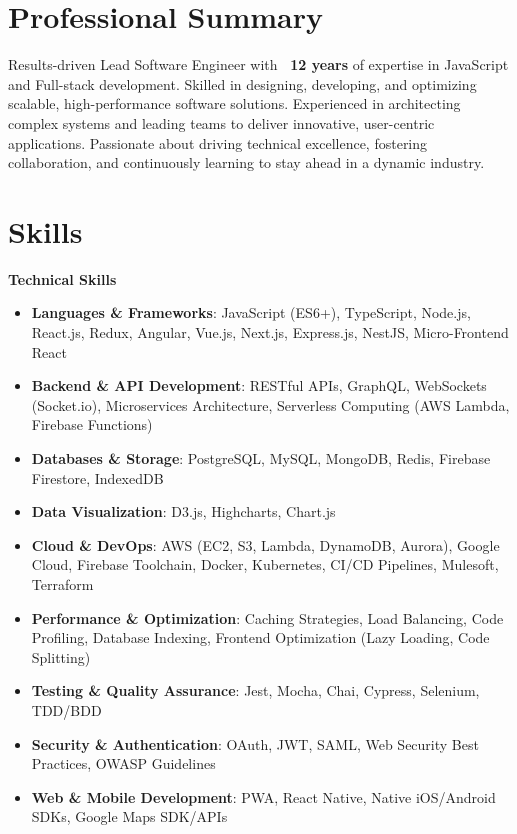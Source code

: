 \documentclass[10pt,a4paper]{article}
\begin{document}
\thispagestyle{fancy}

\section*{Professional Summary}
Results-driven Lead Software Engineer with \textbf{~12 years} of expertise in JavaScript and Full-stack development. Skilled in designing, developing, and optimizing scalable, high-performance software solutions. Experienced in architecting complex systems and leading teams to deliver innovative, user-centric applications. Passionate about driving technical excellence, fostering collaboration, and continuously learning to stay ahead in a dynamic industry.

\section*{Skills}

\textbf{Technical Skills}
\begin{itemize}[leftmargin=*]
  \item \textbf{Languages \& Frameworks}: JavaScript (ES6+), TypeScript, Node.js, React.js, Redux, Angular, Vue.js, Next.js, Express.js, NestJS, Micro-Frontend React
  \item \textbf{Backend \& API Development}: RESTful APIs, GraphQL, WebSockets (Socket.io), Microservices Architecture, Serverless Computing (AWS Lambda, Firebase Functions)
  \item \textbf{Databases \& Storage}: PostgreSQL, MySQL, MongoDB, Redis, Firebase Firestore, IndexedDB
  \item \textbf{Data Visualization}: D3.js, Highcharts, Chart.js
  \item \textbf{Cloud \& DevOps}: AWS (EC2, S3, Lambda, DynamoDB, Aurora), Google Cloud, Firebase Toolchain, Docker, Kubernetes, CI/CD Pipelines, Mulesoft, Terraform
  \item \textbf{Performance \& Optimization}: Caching Strategies, Load Balancing, Code Profiling, Database Indexing, Frontend Optimization (Lazy Loading, Code Splitting)
  \item \textbf{Testing \& Quality Assurance}: Jest, Mocha, Chai, Cypress, Selenium, TDD/BDD
  \item \textbf{Security \& Authentication}: OAuth, JWT, SAML, Web Security Best Practices, OWASP Guidelines
  \item \textbf{Web \& Mobile Development}: PWA, React Native, Native iOS/Android SDKs, Google Maps SDK/APIs
\end{itemize}
\end{document}
